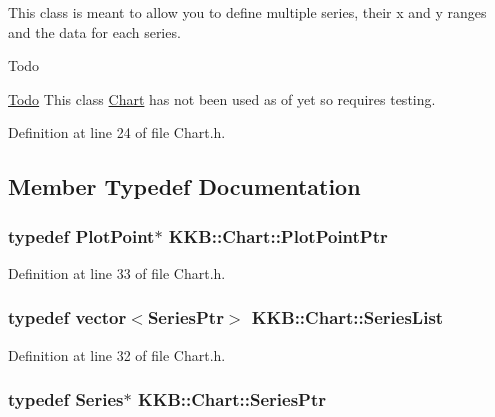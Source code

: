 This class is meant to allow you to define multiple series, their x and y ranges and the data for each series. \begin{DoxyRefDesc}{Todo}
\item[\hyperlink{todo__todo000015}{Todo}]This class \hyperlink{class_k_k_b_1_1_chart}{Chart} has not been used as of yet so requires testing. \end{DoxyRefDesc}


Definition at line 24 of file Chart.\+h.



\subsection{Member Typedef Documentation}
\subsubsection[{\texorpdfstring{Plot\+Point\+Ptr}{PlotPointPtr}}]{\setlength{\rightskip}{0pt plus 5cm}typedef {\bf Plot\+Point}$\ast$ {\bf K\+K\+B\+::\+Chart\+::\+Plot\+Point\+Ptr}}\hypertarget{class_k_k_b_1_1_chart_a21b9bfd1db3224b28cb59153a8ce0691}{}\label{class_k_k_b_1_1_chart_a21b9bfd1db3224b28cb59153a8ce0691}


Definition at line 33 of file Chart.\+h.

\subsubsection[{\texorpdfstring{Series\+List}{SeriesList}}]{\setlength{\rightskip}{0pt plus 5cm}typedef vector$<${\bf Series\+Ptr}$>$ {\bf K\+K\+B\+::\+Chart\+::\+Series\+List}}\hypertarget{class_k_k_b_1_1_chart_a12eb2f2dbd7deac247e045e406a1eaee}{}\label{class_k_k_b_1_1_chart_a12eb2f2dbd7deac247e045e406a1eaee}


Definition at line 32 of file Chart.\+h.

\subsubsection[{\texorpdfstring{Series\+Ptr}{SeriesPtr}}]{\setlength{\rightskip}{0pt plus 5cm}typedef {\bf Series}$\ast$ {\bf K\+K\+B\+::\+Chart\+::\+Series\+Ptr}}\hypertarget{class_k_k_b_1_1_chart_aa47e1a77836cdfb0cfbd1409a02edd97}{}\label{class_k_k_b_1_1_chart_aa47e1a77836cdfb0cfbd1409a02edd97}


